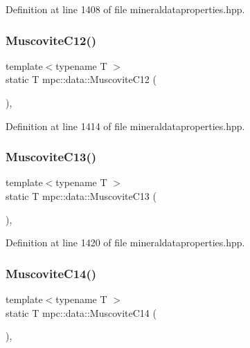 Definition at line 1408 of file mineraldataproperties.\+hpp.

\mbox{\label{namespacempc_1_1data_ac80f0e449af23bb7f9486b84c0977843}} 
\subsubsection{\texorpdfstring{Muscovite\+C12()}{MuscoviteC12()}}
{\footnotesize\ttfamily template$<$typename T $>$ \\
static T mpc\+::data\+::\+Muscovite\+C12 (\begin{DoxyParamCaption}{ }\end{DoxyParamCaption})\hspace{0.3cm}{\ttfamily [inline]}, {\ttfamily [static]}}



Definition at line 1414 of file mineraldataproperties.\+hpp.

\mbox{\label{namespacempc_1_1data_a44274ac9316d5a358cc0525931cf685f}} 
\subsubsection{\texorpdfstring{Muscovite\+C13()}{MuscoviteC13()}}
{\footnotesize\ttfamily template$<$typename T $>$ \\
static T mpc\+::data\+::\+Muscovite\+C13 (\begin{DoxyParamCaption}{ }\end{DoxyParamCaption})\hspace{0.3cm}{\ttfamily [inline]}, {\ttfamily [static]}}



Definition at line 1420 of file mineraldataproperties.\+hpp.

\mbox{\label{namespacempc_1_1data_a693592b2831d05c77efadb72899f8466}} 
\subsubsection{\texorpdfstring{Muscovite\+C14()}{MuscoviteC14()}}
{\footnotesize\ttfamily template$<$typename T $>$ \\
static T mpc\+::data\+::\+Muscovite\+C14 (\begin{DoxyParamCaption}{ }\end{DoxyParamCaption})\hspace{0.3cm}{\ttfamily [inline]}, {\ttfamily [static]}}



